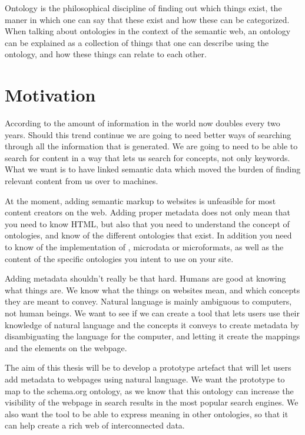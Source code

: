 Ontology is the philosophical discipline of finding out which things exist,
the maner in which one can say that these exist and how these can be categorized.
When talking about ontologies in the context of the semantic web,
an ontology can be explained as a collection of things that one can describe using the ontology,
and how these things can relate to each other.


\section{Motivation}
According to \citet{Gantz2011} the amount of information in the world now doubles every two years.
Should this trend continue we are going to need better ways of searching through all the information that is generated.
We are going to need to be able to search for content in a way that lets us search for concepts, not only keywords.
What we want is to have linked semantic data which moved the burden of finding relevant content from us over to machines.

At the moment, adding semantic markup to websites is unfeasible for most content creators on the web.
Adding proper metadata does not only mean that you need to know HTML,
but also that you need to understand the concept of ontologies, and know of the different ontologies that exist.
In addition you need to know of the implementation of , microdata or microformats,
as well as the content of the specific ontologies you intent to use on your site.

Adding metadata shouldn't really be that hard.
Humans are good at knowing what things are.
We know what the things on websites mean, and which concepts they are meant to convey.
Natural language is mainly ambiguous to computers, not human beings.
We want to see if we can create a tool that lets users use their knowledge of natural language and the concepts it conveys
to create metadata by disambiguating the language for the computer, and letting it create the mappings and the elements on the webpage.

The aim of this thesis will be to develop a prototype artefact that will let users add metadata to webpages using natural language.
We want the prototype to map to the schema.org ontology,
as we know that this ontology can increase the visibility of the webpage in search results in the most popular search engines.
We also want the tool to be able to express meaning in other ontologies, so that it can help create a rich web of interconnected data.

